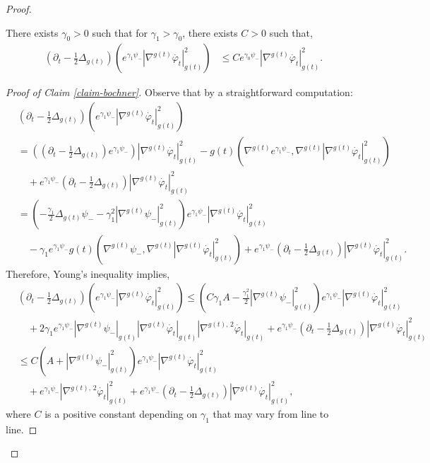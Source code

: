 \documentclass[10pt,a4paper]{amsart}
\newcommand{\f}{\varphi}
\begin{document}
\begin{proof}
\begin{claim}\label{claim-bochner}
There exists $\gamma_0>0$ such that for $\gamma_1>\gamma_0$, there exists $C>0$ such that,
\begin{equation}
\begin{split}\label{est-I-grad}
\left(\partial_t-\frac{1}{2}\Delta_{g(t)}\right)\left(e^{\gamma_1\psi_{-}}|\nabla^{g(t)}\dot{\f_t}|_{g(t)}^2\right)&\leq Ce^{\gamma_0\psi_{-}}|\nabla^{g(t)}\dot{\f_t}|_{g(t)}^2.
\end{split}
\end{equation}
\end{claim}

\begin{proof}[Proof of Claim \ref{claim-bochner}]
Observe that by a straightforward computation:
{\small
\begin{equation*}
\begin{split}
&\left(\partial_t-\frac{1}{2}\Delta_{g(t)}\right)\left(e^{\gamma_1\psi_{-}}|\nabla^{g(t)}\dot{\f_t}|_{g(t)}^2\right)\\
&=\left(\left(\partial_t-\frac{1}{2}\Delta_{g(t)}\right)e^{\gamma_1\psi_{-}}\right)|\nabla^{g(t)}\dot{\f_t}|_{g(t)}^2-g(t)\left(\nabla^{g(t)}e^{\gamma_1\psi_{-}},\nabla^{g(t)}|\nabla^{g(t)}\dot{\f_t}|_{g(t)}^2\right)\\
&\quad+e^{\gamma_1\psi_{-}}\left(\partial_t-\frac{1}{2}\Delta_{g(t)}\right) |\nabla^{g(t)}\dot{\f_t}|_{g(t)}^2\\
&=\left(-\frac{\gamma_1}{2}\Delta_{g(t)}\psi_{-}-\gamma_1^2|\nabla^{g(t)}\psi_{-}|^2_{g(t)}\right)e^{\gamma_1\psi_{-}}|\nabla^{g(t)}\dot{\f_t}|_{g(t)}^2\\
&\quad-\gamma_1e^{\gamma_1\psi_{-}}g(t)\left(\nabla^{g(t)}\psi_{-},\nabla^{g(t)}|\nabla^{g(t)}\dot{\f_t}|_{g(t)}^2\right)+e^{\gamma_1\psi_{-}}\left(\partial_t-\frac{1}{2}\Delta_{g(t)}\right) |\nabla^{g(t)}\dot{\f_t}|_{g(t)}^2.
\end{split}
\end{equation*}
}
Therefore, Young's inequality implies,
{\small
\begin{equation}
\begin{split}\label{lovely-formula}
&\left(\partial_t-\frac{1}{2}\Delta_{g(t)}\right)\left(e^{\gamma_1\psi_{-}}|\nabla^{g(t)}\dot{\f_t}|_{g(t)}^2\right)\leq\left(C\gamma_1 A-\frac{\gamma_1^2}{2}|\nabla^{g(t)}\psi_{-}|^2_{g(t)}\right)e^{\gamma_1\psi_{-}}|\nabla^{g(t)}\dot{\f_t}|_{g(t)}^2\\
&\quad+2\gamma_1e^{\gamma_1\psi_{-}}|\nabla^{g(t)}\psi_{-}|_{g(t)}|\nabla^{g(t)}\dot{\f_t}|_{g(t)}|\nabla^{g(t),\,2}\dot{\f_t}|_{g(t)}+e^{\gamma_1\psi_{-}}\left(\partial_t-\frac{1}{2}\Delta_{g(t)}\right) |\nabla^{g(t)}\dot{\f_t}|_{g(t)}^2\\
&\leq C\left(A+|\nabla^{g(t)}\psi_{-}|^2_{g(t)}\right)e^{\gamma_1\psi_{-}}|\nabla^{g(t)}\dot{\f_t}|_{g(t)}^2\\
&\quad +e^{\gamma_1\psi_{-}}|\nabla^{g(t),\,2}\dot{\f_t}|^2_{g(t)}+e^{\gamma_1\psi_{-}}\left(\partial_t-\frac{1}{2}\Delta_{g(t)}\right) |\nabla^{g(t)}\dot{\f_t}|_{g(t)}^2,
\end{split}
\end{equation}
}
where $C$ is a positive constant depending on $\gamma_1$ that may vary from line to line.


\end{proof}
\end{proof}
\end{document}
